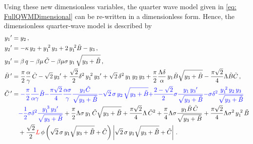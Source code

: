 Using these new dimensionless variables, the quarter wave model given in \cref{eq: FullQWMDimensional} can be re-written in a dimensionless form. Hence, the dimensionless quarter-wave model is described by
~
\begin{equation} \label{eq: FullQWMDimensionless}
\begin{split}
    \dash{y_1} &= y_2 \, , \\
    \dash{y_2} &= - \kappa \, y_2 + y_1\power{2} \, y_3 + 2 \, y_1\power{2} \tilde{B} - y_3 \, , \\
    \dash{y_3} &= \beta \, q - \beta \mu \, \tilde{C} - \beta \mu \sigma \, y_1 \, \sqrt{y_3 + \tilde{B}} \, , \\
    \dash{\tilde{B}\,} &= \frac{\pi}{2} \frac{\alpha}{\gamma} \, \tilde{C} - \sqrt{2} \, \dash{y_3} + \frac{\sqrt{2}}{2} \delta^2 \, y_1\power{2} \, \dash{y_3} + \sqrt{2} \, \delta^2 \, y_1 \, y_2 \, y_3 + \frac{\pi}{2} \frac{\Lambda \delta}{\alpha} \, y_1 \tilde{B} \sqrt{y_3 + \tilde{B}} - \frac{\pi \sqrt{2}}{4} \Lambda \tilde{B} \tilde{C} \, , \\
    \dash{\tilde{C}\,} &=
    \textcolor{Blue}{- \frac{\pi}{2} \frac{1}{\alpha \gamma} \tilde{B}}
    \textcolor{Blue}{- \frac{\pi \sqrt{2}}{4} \frac{\alpha \sigma}{\gamma} \frac{y_1 \tilde{C}}{\sqrt{y_3 + \tilde{B}}} }
    \textcolor{Blue}{- \sqrt{2} \, \sigma \, y_2 \, \sqrt{y_3 + \tilde{B}} }
    \textcolor{Blue}{+ \frac{2-\sqrt{2}}{2} \sigma \frac{y_1 \, \dash{y_3}}{\sqrt{y_3 + \tilde{B}}} }
    \textcolor{Blue}{- \sigma \delta^2 \frac{y_1\power{2} \, y_2 \, y_3}{\sqrt{y_3 + \tilde{B}}} }
    \\ & \quad %
    \textcolor{Blue}{- \frac{1}{2} \sigma \delta^2 \frac{y_1\power{3} \, \dash{y_3}}{\sqrt{y_3 + \tilde{B}}} }
    + \frac{\pi}{2} \Lambda \sigma \, y_1 \, \tilde{C} \sqrt{y_3 + \tilde{B}}
    + \frac{\pi \sqrt{2}}{4} \Lambda \, \tilde{C}^2
    + \frac{\pi}{4} \Lambda \sigma \frac{y_1 \tilde{B} \, \tilde{C}}{\sqrt{y_3 + \tilde{B}}}
    + \frac{\pi \sqrt{2}}{4} \Lambda \sigma^2 \, y_1\power{2} \, \tilde{B}
    \\ & \quad %
    + \frac{\sqrt{2}}{2}
    \textcolor{Red}{L} \,
    \phi \left( \sqrt{2} \, \sigma \, y_1 \sqrt{y_3 + \tilde{B}} + \tilde{C} \right) \left| \sqrt{2} \, \sigma \, y_1 \sqrt{y_3 + \tilde{B}} + \tilde{C} \right| \, .
\end{split}
\end{equation}

